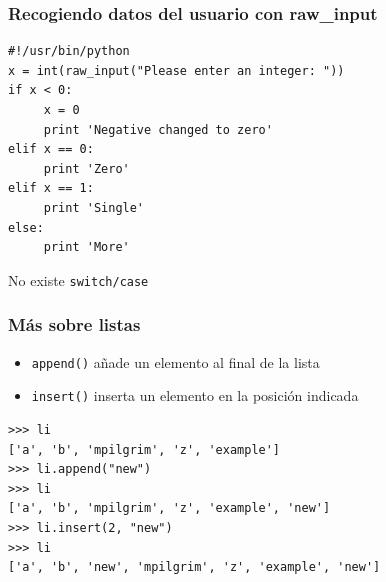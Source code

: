 \documentclass{beamer}
\begin{document}
\begin{frame}[fragile]
\frametitle{Recogiendo datos del usuario con raw\_input}

\begin{footnotesize}
\begin{verbatim}
#!/usr/bin/python
x = int(raw_input("Please enter an integer: "))
if x < 0:
     x = 0
     print 'Negative changed to zero'
elif x == 0:
     print 'Zero'
elif x == 1:
     print 'Single'
else:
     print 'More'
\end{verbatim}
\end{footnotesize}
  

No existe \verb|switch/case|
\end{frame}














\begin{frame}[fragile]
\frametitle{Más sobre listas}

\begin{itemize}
\item \verb|append()| añade un elemento al final de la lista
\item \verb|insert()| inserta un elemento en la posición indicada
\end{itemize}  

\begin{footnotesize}
\begin{verbatim}
>>> li
['a', 'b', 'mpilgrim', 'z', 'example']
>>> li.append("new")               
>>> li
['a', 'b', 'mpilgrim', 'z', 'example', 'new']
>>> li.insert(2, "new")           
>>> li
['a', 'b', 'new', 'mpilgrim', 'z', 'example', 'new']
\end{verbatim}
\end{footnotesize}


\end{frame}
\end{document}
